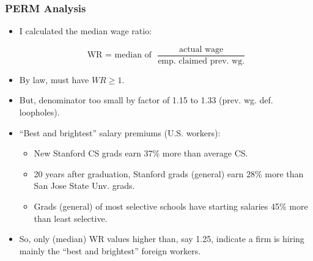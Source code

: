 \documentclass{beamer}
\begin{document}
\begin{frame}
\frametitle{PERM Analysis}

\pause

\begin{itemize}

\item I calculated the median wage ratio:

$$
\textrm{WR = median of} ~~~
   \frac{\textrm{actual wage}}{\textrm{emp. claimed prev. wg.}}
$$

\pause

\item By law, must have $WR \geq 1$.
\pause

\item But, denominator too small by factor of 1.15 to 1.33 (prev. wg.
def. loopholes).
\pause

\item ``Best and brightest'' salary premiums (U.S. workers):
\pause

   \begin{itemize}

   \item New Stanford CS grads earn 37\% more than average CS.  
   \pause

   \item 20 years after graduation, Stanford grads (general) earn 28\%
   more than San Jose State Unv. grads.
   \pause

   \item Grads (general) of most selective schools have starting salaries
   45\% more than least selective.
   \end{itemize}

\pause

\item So, only (median) WR values higher than, say 1.25, indicate a firm is
hiring mainly the ``best and brightest'' foreign workers.

\end{itemize}

\end{frame}
\end{document}
